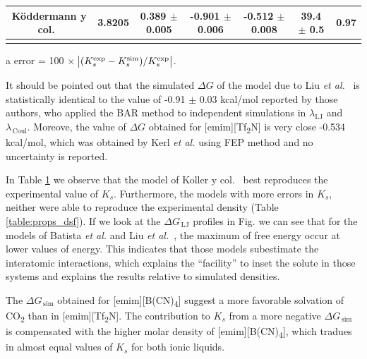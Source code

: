 \documentclass[3p,twocolumn]{elsarticle}
\begin{document}
\begin{table}
\begin{adjustbox}{width=1\textwidth}
\begin{threeparttable}
\begin{tabular}{ c c c  c  c  c  c }
		\hline
 K\"{o}ddermann y col.~\cite{K_ddermann_2007} &3.8205 & 0.389 $\pm$ 0.005 & -0.901 $\pm$ 0.006& -0.512 $\pm$ 0.008 & 39.4 $\pm$ 0.5  & 0.97  \\
 \bottomrule
\label{table:henry} 
\end{tabular}
\begin{tablenotes}
\item[a] error = 100 $\times$ $\abs{(K_s^{\text{exp}} - K_s^{\text{sim}})/K_s^{\text{exp}}}$.
\end{tablenotes}
\end{threeparttable}
\end{adjustbox}
\end{table}

It should be pointed out that the simulated $\Delta G$ of the model due to Liu \textit{et al.}~\cite{Liu_2014} is statistically identical to the value of -0.91 $\pm$ 0.03 kcal/mol reported by those authors, who applied the BAR method to independent simulations in $\lambda_{\text{LJ}}$ and $\lambda_{\, \text{Coul}}$. Moreove, the value of $\Delta G$ obtained for [emim][Tf\textsubscript{2}N] is very close -0.534 kcal/mol, which was obtained by Kerl \textit{et al.} \cite{Kerl__2017} using FEP method and no uncertainty is reported.

In Table \ref{table:henry} we observe that the model of Koller y col.~\cite{Koller_2012} best reproduces the experimental value of $K_s$. Furthermore, the models with more errors in $K_s$, neither were able to reproduce the experimental density (Table \ref{table:props_dsf}). If we  look at the $\Delta G_{\, \text{LJ}}$ profiles in Fig. we can see that for the models of Batista \textit{et al.} \cite{Batista_2015} and Liu \textit{et al.}~\cite{Liu_2014}, the maximum of free energy occur at lower values of energy. This indicates that those models subestimate the interatomic interactions, which explains the ``facility'' to inset the solute in those systems and explains the results relative to simulated densities. 

The $\Delta G_{\, \text{sim}}$ obtained for [emim][B(CN)\textsubscript{4}] suggest a more favorable solvation of CO\textsubscript{2} than in [emim][Tf\textsubscript{2}N]. The contribution to $K_s$ from a more negative $\Delta G_{\, \text{sim}}$ is compensated with the higher molar density of [emim][B(CN)\textsubscript{4}], which tradues in almost equal values of $K_s$ for both ionic liquids.
\end{document}
